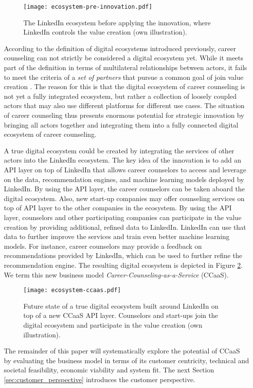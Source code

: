  \begin{figure}[hbt!]
    \centering
    \caption{The LinkedIn ecosystem before applying the innovation, where LinkedIn controls the value creation (own illustration).}
    \label{fig:ecosystem}
    \texttt{[image: ecosystem-pre-innovation.pdf]}
\end{figure}

According to the definition of digital ecosystems introduced previously, career counseling can not strictly be considered
a digital ecosystem yet. While it meets part of the definition in terms of multilateral relationships between actors, it
fails to meet the criteria of a \textit{set of partners} that pursue a common goal of join value creation \citep{adnerEcosystemStructureActionable2017}.
The reason for this is that the digital ecosystem of career counseling is not yet a fully integrated ecosystem, but rather
a collection of loosely coupled actors that may also use different platforms for different use cases. The situation of 
career counseling thus presents enormous potential for strategic innovation by bringing all actors together and integrating
them into a fully connected digital ecosystem of career counseling.

A true digital ecosystem could be created by integrating the services of other actors into the LinkedIn ecosystem.
The key idea of the innovation is to add an API layer on top of LinkedIn that allows career counselors to access and leverage
on the data, recommendation engines, and machine learning models deployed by LinkedIn. By using the API layer, the career
counselors can be taken aboard the digital ecosystem. Also, new start-up companies may offer counseling services on top of 
API layer to the other companies in the ecosystem. By using the API layer, counselors and other participating companies can
participate in the value creation by providing additional, refined data to LinkedIn. LinkedIn can use that data to further
improve the services and train even better machine learning models. For instance, career counselors may provide a feedback
on recommendations provided by LinkedIn, which can be used to further refine the recommendation engine. The resulting digital
ecosystem is depicted in Figure \ref{fig:ecosystem-ccaas}. We term this new business model \textit{Career-Counseling-as-a-Service}
(CCaaS).

\begin{figure}[h!]
    \centering
    \caption{Future state of a true digital ecosystem built around LinkedIn on top of a new CCaaS API layer. Counselors and
    start-ups join the digital ecosystem and participate in the value creation (own illustration).}
    \label{fig:ecosystem-ccaas}
    \texttt{[image: ecosystem-ccaas.pdf]}
\end{figure}

The remainder of this paper will systematically explore the potential of CCaaS by evaluating the business
model in terms of its customer centricity, technical and societal feasibility, economic viability and system fit. 
The next Section \ref{sec:customer_perspective} introduces the customer perspective.
